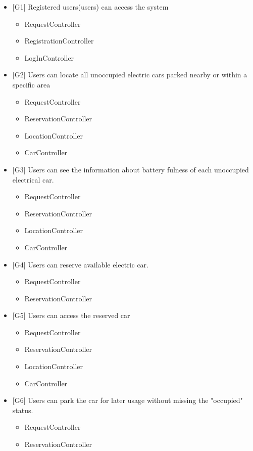 \documentclass[12pt, letterpaper]{article}
\begin{document}
\begin{itemize}
	\item {[G1]} Registered users(users) can access the system
	\begin{itemize}
		\item RequestController
		\item RegistrationController
		\item LogInController
	\end{itemize}
	\item {[G2]} Users can locate all unoccupied electric cars parked nearby or within a specific area
	\begin{itemize}
		\item RequestController
		\item ReservationController
		\item LocationController
		\item CarController
	\end{itemize}
	\item {[G3]} Users can see the information about battery fulness of each unoccupied electrical car.
	\begin{itemize}
		\item RequestController
		\item ReservationController
		\item LocationController
		\item CarController
	\end{itemize}
	\item {[G4]} Users can reserve available electric car.
	\begin{itemize}
		\item RequestController
		\item ReservationController
	\end{itemize}
	\item {[G5]} Users can access the reserved car
	\begin{itemize}
		\item RequestController
		\item ReservationController
		\item LocationController
		\item CarController
	\end{itemize}
	\item {[G6]} Users can park the car for later usage without missing the "occupied" status.
	\begin{itemize}
		\item RequestController
		\item ReservationController

\end{itemize}
\end{itemize}
\end{document}
